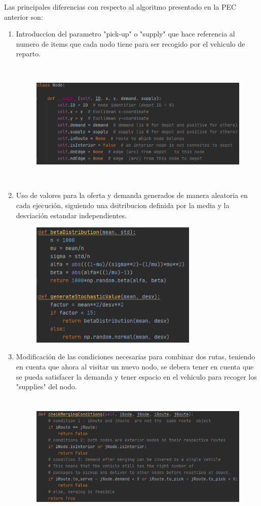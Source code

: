 \documentclass[11pt]{article} %
\begin{document}
\begin{enumerate}
Las principales diferencias con respecto al algoritmo presentado en la PEC anterior son:
\begin{enumerate}
\item Introduccion del parametro "pick-up" o "supply" que hace referencia al numero de items que cada nodo tiene para ser recogido por el vehiculo de reparto.
\begin{figure}[H]
\centering
\includegraphics[width=\linewidth, height=6cm]{Node.png} 
\end{figure}
\item Uso de valores para la oferta y demanda generados de manera aleatoria en cada ejecución, siguiendo una dsitribucion definida por la media y la desviación estandar independientes.
\begin{figure}[H]
\centering
\includegraphics[width=0.55\linewidth, height=6cm]{StochDistrib.png} 
\end{figure}
\item Modificación de las condiciones necesarias para combinar dos rutas, teniendo en cuenta que ahora al visitar un nuevo nodo, se debera tener en cuenta que se pueda satisfacer la demanda y tener espacio en el vehiculo para recoger los "supplies" del nodo.
\begin{figure}[H]
\centering
\includegraphics[width=\linewidth, height=6cm]{merge.png} 
\end{figure}
\end{enumerate}


\end{enumerate}
\end{document}
